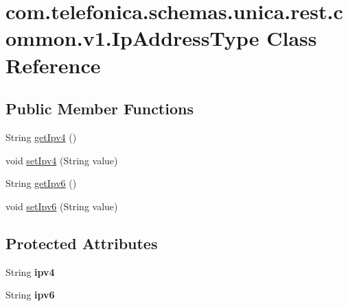 \hypertarget{classcom_1_1telefonica_1_1schemas_1_1unica_1_1rest_1_1common_1_1v1_1_1IpAddressType}{
\section{com.telefonica.schemas.unica.rest.common.v1.IpAddressType Class Reference}
\label{classcom_1_1telefonica_1_1schemas_1_1unica_1_1rest_1_1common_1_1v1_1_1IpAddressType}
}
\subsection*{Public Member Functions}
\begin{DoxyCompactItemize}
\item 
String \hyperlink{classcom_1_1telefonica_1_1schemas_1_1unica_1_1rest_1_1common_1_1v1_1_1IpAddressType_ac5aa46a50cccbe90e5bbf9ffd3ce2f55}{getIpv4} ()
\item 
void \hyperlink{classcom_1_1telefonica_1_1schemas_1_1unica_1_1rest_1_1common_1_1v1_1_1IpAddressType_ae241a19a0ddef84b2a55fac925a58e80}{setIpv4} (String value)
\item 
String \hyperlink{classcom_1_1telefonica_1_1schemas_1_1unica_1_1rest_1_1common_1_1v1_1_1IpAddressType_addd2560dc811565e15e313f8f666530d}{getIpv6} ()
\item 
void \hyperlink{classcom_1_1telefonica_1_1schemas_1_1unica_1_1rest_1_1common_1_1v1_1_1IpAddressType_aea733413a1dd41d99786de54197b34ae}{setIpv6} (String value)
\end{DoxyCompactItemize}
\subsection*{Protected Attributes}
\begin{DoxyCompactItemize}
\item 
\hypertarget{classcom_1_1telefonica_1_1schemas_1_1unica_1_1rest_1_1common_1_1v1_1_1IpAddressType_a7e967bed7c1253837c9fa4912df5c1c8}{
String {\bfseries ipv4}}
\label{classcom_1_1telefonica_1_1schemas_1_1unica_1_1rest_1_1common_1_1v1_1_1IpAddressType_a7e967bed7c1253837c9fa4912df5c1c8}

\item 
\hypertarget{classcom_1_1telefonica_1_1schemas_1_1unica_1_1rest_1_1common_1_1v1_1_1IpAddressType_ab5354b81a4498a244f2bfd115d8c509f}{
String {\bfseries ipv6}}
\label{classcom_1_1telefonica_1_1schemas_1_1unica_1_1rest_1_1common_1_1v1_1_1IpAddressType_ab5354b81a4498a244f2bfd115d8c509f}

\end{DoxyCompactItemize}


